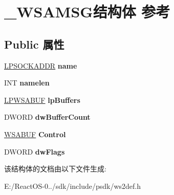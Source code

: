 \hypertarget{struct___w_s_a_m_s_g}{}\section{\+\_\+\+W\+S\+A\+M\+S\+G结构体 参考}
\label{struct___w_s_a_m_s_g}
\subsection*{Public 属性}
\begin{DoxyCompactItemize}
\item 
\mbox{\label{struct___w_s_a_m_s_g_a6b2095014f953bd3746729511f54f403}} 
\hyperlink{structsockaddr}{L\+P\+S\+O\+C\+K\+A\+D\+DR} {\bfseries name}
\item 
\mbox{\label{struct___w_s_a_m_s_g_ac1d0e811efa8164089c3b0f784dd6ed1}} 
I\+NT {\bfseries namelen}
\item 
\mbox{\label{struct___w_s_a_m_s_g_a16c87f80337978f38ce9025d034da129}} 
\hyperlink{struct___w_s_a_b_u_f}{L\+P\+W\+S\+A\+B\+UF} {\bfseries lp\+Buffers}
\item 
\mbox{\label{struct___w_s_a_m_s_g_a27988b450f3baa6adf3ecfa146a5bf9a}} 
D\+W\+O\+RD {\bfseries dw\+Buffer\+Count}
\item 
\mbox{\label{struct___w_s_a_m_s_g_aaed1bf14a09bb8cf18800ccfe3cf6627}} 
\hyperlink{struct___w_s_a_b_u_f}{W\+S\+A\+B\+UF} {\bfseries Control}
\item 
\mbox{\label{struct___w_s_a_m_s_g_a4311e6f6012d058746a54a1dd964220d}} 
D\+W\+O\+RD {\bfseries dw\+Flags}
\end{DoxyCompactItemize}


该结构体的文档由以下文件生成\+:\begin{DoxyCompactItemize}
\item 
E\+:/\+React\+O\+S-\/0../sdk/include/psdk/ws2def.\+h\end{DoxyCompactItemize}
